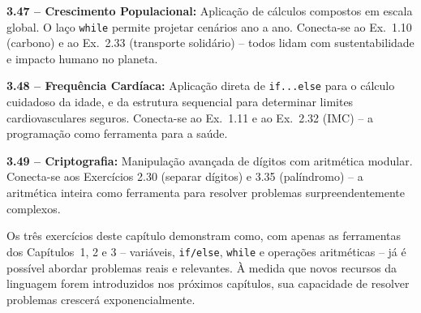\documentclass[12pt,a4paper]{article}
\begin{document}
\begin{tcolorbox}[colback=deitellightblue,colframe=deitelblue,
  title={\bfseries Os três exercícios e suas conexões}]

\textbf{3.47 -- Crescimento Populacional:}
Aplicação de cálculos compostos em escala global. O laço \texttt{while} permite projetar
cenários ano a ano. Conecta-se ao Ex.~1.10 (carbono) e ao Ex.~2.33 (transporte solidário) --
todos lidam com sustentabilidade e impacto humano no planeta.

\medskip\textbf{3.48 -- Frequência Cardíaca:}
Aplicação direta de \texttt{if...else} para o cálculo cuidadoso da idade,
e da estrutura sequencial para determinar limites cardiovasculares seguros. Conecta-se
ao Ex.~1.11 e ao Ex.~2.32 (IMC) -- a programação como ferramenta para a saúde.

\medskip\textbf{3.49 -- Criptografia:}
Manipulação avançada de dígitos com aritmética modular. Conecta-se aos Exercícios
2.30 (separar dígitos) e 3.35 (palíndromo) -- a aritmética inteira como ferramenta
para resolver problemas surpreendentemente complexos.

\end{tcolorbox}

\begin{boaprática}
  Os três exercícios deste capítulo demonstram como, com apenas as ferramentas dos
  Capítulos~1, 2 e 3 -- variáveis, \texttt{if/else}, \texttt{while} e operações
  aritméticas -- já é possível abordar problemas reais e relevantes. À medida que
  novos recursos da linguagem forem introduzidos nos próximos capítulos, sua
  capacidade de resolver problemas crescerá exponencialmente.
\end{boaprática}
\end{document}
